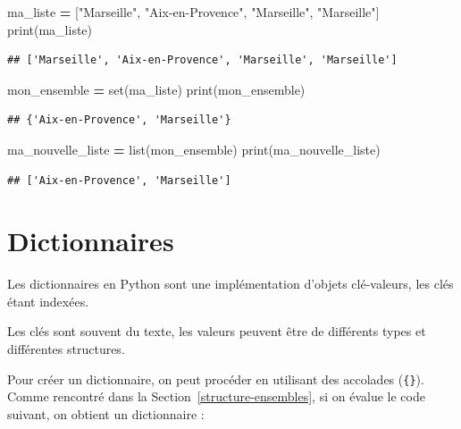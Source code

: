 \documentclass[
  12pt,
]{book}
\newenvironment{Shaded}{\begin{snugshade}}{\end{snugshade}}
\newcommand{\BuiltInTok}[1]{#1}
\newcommand{\NormalTok}[1]{#1}
\newcommand{\OperatorTok}[1]{\textcolor[rgb]{0.81,0.36,0.00}{\textbf{#1}}}
\newcommand{\StringTok}[1]{\textcolor[rgb]{0.31,0.60,0.02}{#1}}
\numberwithin{equation}{section}
\numberwithin{countremarque}{section}
\begin{document}
\begin{Shaded}
\begin{Highlighting}[]
\NormalTok{ma\_liste }\OperatorTok{=}\NormalTok{ [}\StringTok{"Marseille"}\NormalTok{, }\StringTok{"Aix{-}en{-}Provence"}\NormalTok{, }\StringTok{"Marseille"}\NormalTok{, }\StringTok{"Marseille"}\NormalTok{]}
\BuiltInTok{print}\NormalTok{(ma\_liste)}
\end{Highlighting}
\end{Shaded}

\begin{lstlisting}
## ['Marseille', 'Aix-en-Provence', 'Marseille', 'Marseille']
\end{lstlisting}

\begin{Shaded}
\begin{Highlighting}[]
\NormalTok{mon\_ensemble }\OperatorTok{=} \BuiltInTok{set}\NormalTok{(ma\_liste)}
\BuiltInTok{print}\NormalTok{(mon\_ensemble)}
\end{Highlighting}
\end{Shaded}

\begin{lstlisting}
## {'Aix-en-Provence', 'Marseille'}
\end{lstlisting}

\begin{Shaded}
\begin{Highlighting}[]
\NormalTok{ma\_nouvelle\_liste }\OperatorTok{=} \BuiltInTok{list}\NormalTok{(mon\_ensemble)}
\BuiltInTok{print}\NormalTok{(ma\_nouvelle\_liste)}
\end{Highlighting}
\end{Shaded}

\begin{lstlisting}
## ['Aix-en-Provence', 'Marseille']
\end{lstlisting}

\section{Dictionnaires}\label{type-dict}

Les dictionnaires en Python sont une implémentation d'objets clé-valeurs, les clés étant indexées.

Les clés sont souvent du texte, les valeurs peuvent être de différents types et différentes structures.

Pour créer un dictionnaire, on peut procéder en utilisant des accolades (\texttt{\{\}}). Comme rencontré dans la Section~\ref{structure-ensembles}, si on évalue le code suivant, on obtient un dictionnaire :
\end{document}
